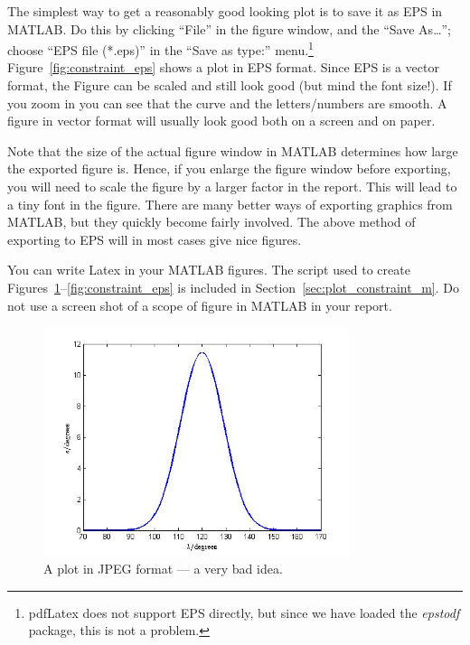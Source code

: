 The simplest way to get a reasonably good looking plot is to save it as EPS in MATLAB. Do this by clicking ``File'' in the figure window, and the ``Save As\ldots''; choose ``EPS file (*.eps)'' in the ``Save as type:'' menu.\footnote{pdfLatex does not support EPS directly, but since we have loaded the \emph{epstodf} package, this is not a problem.} Figure~\ref{fig:constraint_eps} shows a plot in EPS format. Since EPS is a vector format, the Figure can be scaled and still look good (but mind the font size!). If you zoom in you can see that the curve and the letters/numbers are smooth. A figure in vector format will usually look good both on a screen and on paper.

Note that the size of the actual figure window in MATLAB determines how large the exported figure is. Hence, if you enlarge the figure window before exporting, you will need to scale the figure by a larger factor in the report. This will lead to a tiny font in the figure. There are many better ways of exporting graphics from MATLAB, but they quickly become fairly involved. The above method of exporting to EPS will in most cases give nice figures.

You can write Latex in your MATLAB figures. The script used to create Figures~\ref{fig:constraint_jpg}--\ref{fig:constraint_eps} is included in Section~\ref{sec:plot_constraint_m}. Do not use a screen shot of a scope of figure in MATLAB in your report.


\begin{figure}[htb]
	\centering
		\includegraphics[width=0.8\textwidth]{figures/constraint_jpg.jpg}
	\caption{A plot in JPEG format --- a very bad idea.}
	\label{fig:constraint_jpg}
\end{figure}

